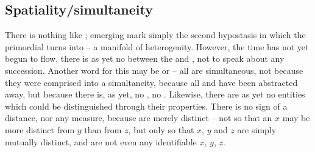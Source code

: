 \subsection{Spatiality/simultaneity}\label{sub:spatialityBeforeTemporality}
\pa\label{pa:spatialityBeforeTemporality} There is nothing like ; emerging  mark simply the second
hypostasis in which the primordial  turns into  -- a
manifold of heterogenity. However, the time has not yet begun to flow, there is
as yet no  between the  and , not to
speak about any succession. Another word for this may be  or
 -- all  are simultaneous, not because they
were comprised into a simultaneity, because all  and  have
been abstracted away, but because there is, as yet, no , no
.  Likewise, there are as yet no entities which could be
distinguished through their properties.    There is no sign of a distance, nor
any measure, because  are merely distinct -- not so that an $x$
may be more distinct from $y$ than from $z$, but only so that $x$, $y$ and $z$
are simply mutually distinct, and are not even any identifiable $x$, $y$, $z$.


